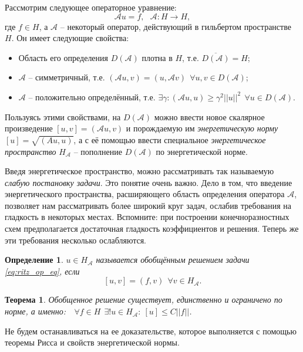 \documentclass[a4paper, 11pt]{article}
\newtheorem{definition}{Определение}
\newtheorem{theorem}{Теорема}
\begin{document}
Рассмотрим следующее операторное уравнение:
\begin{equation}\label{eq:ritz_op_eq}
\mathcal{A}u = f,~~~\mathcal{A}: H \rightarrow H,
\end{equation}
где $f \in H$, а $\mathcal{A}$ -- некоторый оператор, действующий в гильбертом пространстве $H$. Он имеет следующие свойства:
\begin{itemize}
	\item Область его определения $D(\mathcal{A})$ плотна в $H$, т.е. $\overline{D(\mathcal{A})} = H$;
	\item $\mathcal{A}$ -- симметричный, т.е. $(\mathcal{A}u,v) = (u,\mathcal{A}v)~~\forall u,v \in D(\mathcal{A})$;
	\item $\mathcal{A}$ -- положительно определённый, т.е. $\exists \gamma: (\mathcal{A}u,u) \ge \gamma^2 ||u||^2~~\forall u \in D(\mathcal{A})$.
\end{itemize}

Пользуясь этими свойствами, на $D(\mathcal{A})$ можно ввести новое скалярное произведение $[u,v] = (\mathcal{A}u,v)$ и порождаемую им \textit{энергетическую норму} $[u] = \sqrt{(Au,u)}$, а с её помощью ввести специальное
\textit{энергетическое пространство} $H_\mathcal{A}$ -- пополнение $D(\mathcal{A})$ по энергетической норме. 

Введя энергетическое пространство, можно рассматривать так называемую \textit{слабую постановку задачи}. Это понятие очень важно. Дело в том, что введение энергетического пространства, расширяющего область определения оператора $\mathcal{A}$, позволяет нам рассматривать более широкий круг задач, ослабив требования на гладкость в некоторых местах. Вспомните: при построении конечноразностных схем предполагается достаточная гладкость коэффициентов и решения. Теперь же эти требования несколько ослабляются.
\begin{definition}\label{eq:ritz_weak_sol}
	$u \in H_\mathcal{A}$ называется \textit{обобщённым решением задачи \eqref{eq:ritz_op_eq}}, если
	$$
	[u,v] = (f, v)~~\forall v \in H_\mathcal{A}.
	$$
\end{definition}

\begin{theorem}
	Обобщенное решение существует, единственно и ограничено по норме, а именно:~~$\forall f \in H~~ \exists! u \in H_{\mathcal{A}}:~ [u] \le C||f||$.
\end{theorem}
Не будем останавливаться на ее доказательстве, которое выполняется с помощью теоремы Рисса и свойств энергетической нормы.
\end{document}
